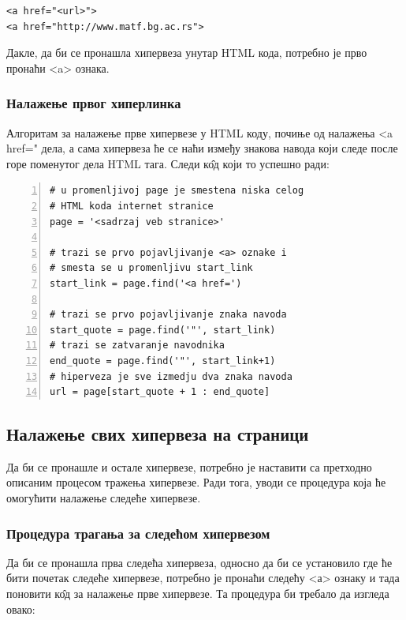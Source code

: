 \begin{lstlisting}[caption = <a> ознака, label = a_tag]
<a href="<url>">
<a href="http://www.matf.bg.ac.rs">
\end{lstlisting}

Дакле, да би се пронашла хипервеза унутар HTML кода, потребно је прво пронаћи <a> ознака.

\subsubsection{Налажење првог хиперлинка}

Алгоритам за налажење прве хипервезе у HTML коду, почиње од налажења <a href=" дела, а сама хипервеза ће се наћи између знакова навода који следе после горе поменутог дела HTML тага. Следи к\^{о}д који то успешно ради:

\begin{lstlisting}[caption = Налажење првог хиперлинка, label = {lst:first_url}, numbers = left]
# u promenljivoj page je smestena niska celog
# HTML koda internet stranice
page = '<sadrzaj veb stranice>'

# trazi se prvo pojavljivanje <a> oznake i
# smesta se u promenljivu start_link
start_link = page.find('<a href=')

# trazi se prvo pojavljivanje znaka navoda
start_quote = page.find('"', start_link)
# trazi se zatvaranje navodnika
end_quote = page.find('"', start_link+1)
# hiperveza je sve izmedju dva znaka navoda
url = page[start_quote + 1 : end_quote]
\end{lstlisting}

\subsection{Налажење свих хипервеза на страници}

Да би се пронашле и остале хипервезе, потребно је наставити са претходно описаним процесом тражења хипервезе. Ради тога, уводи се процедура која ће омогућити налажење следеће хипервезе.

\subsubsection{Процедура трагања за следећом хипервезом}

Да би се пронашла прва следећа хипервеза, односно да би се установило где ће бити почетак следеће хипервезе, потребно је пронаћи следећу <а> ознаку и тада поновити к\^{о}д за налажење прве хипервезе. Та процедура би требало да изгледа овако:

